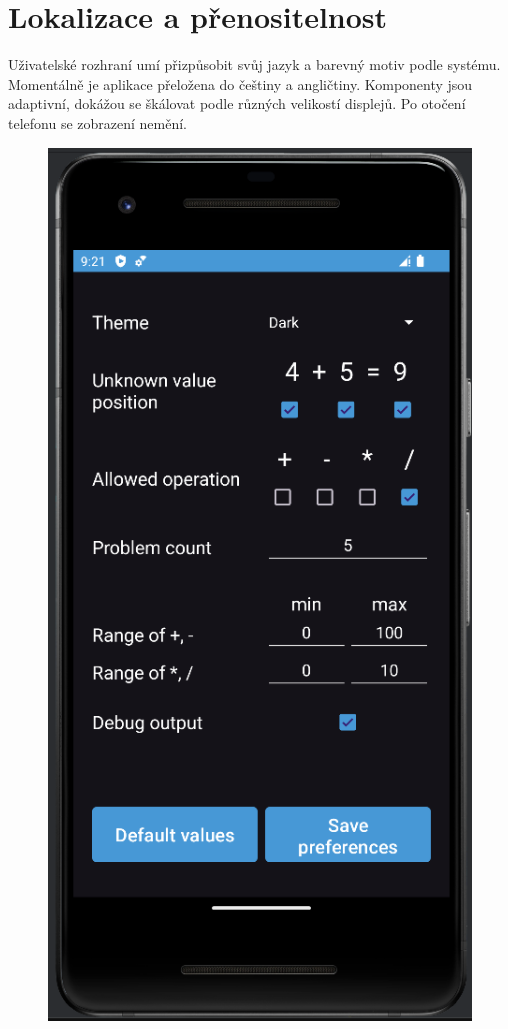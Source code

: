 \documentclass[12pt]{report}
\begin{document}
	\newpage
	\section{Lokalizace a přenositelnost}
	Uživatelské rozhraní umí přizpůsobit svůj jazyk a barevný motiv podle systému. Momentálně je aplikace přeložena do češtiny a angličtiny. Komponenty jsou adaptivní, dokážou se škálovat podle různých velikostí displejů. Po otočení telefonu se zobrazení nemění. 
	
	\begin{figure}[ht]
		\centering
		\begin{minipage}{.5\textwidth}
			\centering
			\includegraphics[height=1.7\textwidth]{img/dark_1}

\end{minipage}
\end{figure}
\end{document}
